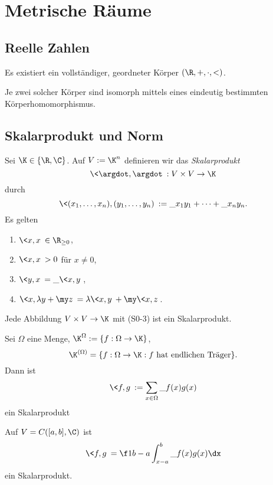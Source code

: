 \chapter{Metrische Räume}

\section{Reelle Zahlen}

\begin{st}
	Es existiert ein vollständiger, geordneter Körper $(\R,+,\cdot,<)$.

	Je zwei solcher Körper sind isomorph mittels eines eindeutig bestimmten Körperhomomorphismus.
\end{st}


\section{Skalarprodukt und Norm}

\begin{df}
	Sei $\K \in \{\R, \C\}$.
	Auf $V := \K^n$ definieren wir das \emph{Skalarprodukt}
	\[
		\<\argdot, \argdot\> : V \times V \to \K
	\]
	durch
	\[
		\<(x_1,\dotsc, x_n), (y_1,\dotsc, y_n)\> := \_{x_1}y_1 + \dotsb + \_{x_n}y_n.
	\]
	Es gelten
	\begin{enumerate}[({S}1),start=0]
		\item
			$\<x,x\>  \in \R_{\ge 0}$,
		\item
			$\<x,x\> > 0$ für $x \neq 0$,
		\item
			$\<y,x\> = \_{\<x,y\>}$,
		\item
			$\<x,\lambda y + \my z\> = \lambda \<x,y\> + \my\<x,z\>$.
	\end{enumerate}
	Jede Abbildung $V\times V \to \K$ mit (S0-3) ist ein Skalarprodukt.
\end{df}

\begin{ex}
	Sei $\Omega$ eine Menge, $\K^{\Omega} := \{f : \Omega \to \K\}$,
	\[
		\K^{(\Omega)} = \{ f: \Omega \to \K : f \text{ hat endlichen Träger} \}.
	\]
	Dann ist
	\[
		\<f,g\> := \sum_{x\in \Omega} \_{f(x)}g(x)
	\]
	ein Skalarprodukt
\end{ex}

\begin{ex}
	Auf $V = C([a,b], \C)$ ist
	\[
		\<f,g\> = \f 1{b-a} \int_{x-a}^b \_{f(x)} g(x) \dx
	\]
	ein Skalarprodukt.
\end{ex}


